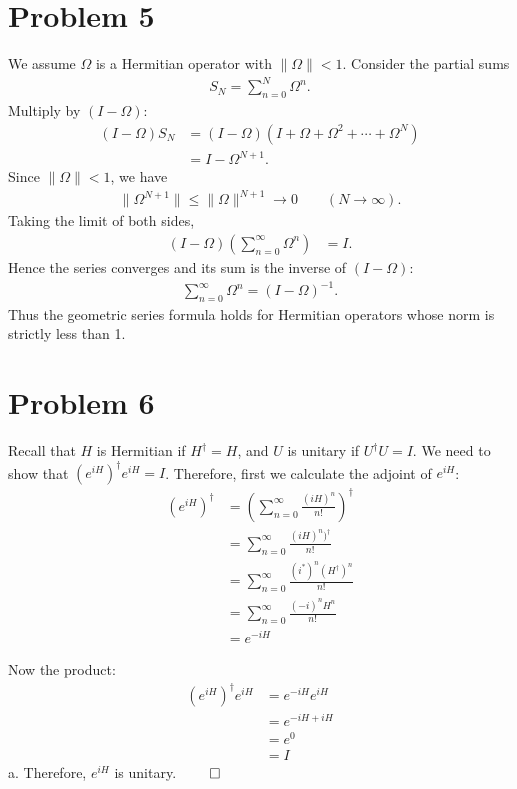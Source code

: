 \documentclass[10pt,twocoloumn]{article}
\begin{document}
\section*{Problem 5}
We assume $\Omega$ is a Hermitian operator with $\|\Omega\|<1$.
Consider the partial sums
\begin{align}
S_N = \sum_{n=0}^N \Omega^n .
\end{align}
Multiply by $(I-\Omega)$:
\begin{align}
(I-\Omega) S_N
&= (I-\Omega)\left(I + \Omega + \Omega^2 + \cdots + \Omega^N\right) \\
&= I - \Omega^{N+1}.
\end{align}
Since $\|\Omega\|<1$, we have
\begin{align}
\|\Omega^{N+1}\| \le \|\Omega\|^{N+1} \longrightarrow 0
\qquad (N\to\infty).
\end{align}
Taking the limit of both sides,
\begin{align}
(I-\Omega)\left( \sum_{n=0}^{\infty} \Omega^n \right)
&= I .
\end{align}
Hence the series converges and its sum is the inverse of $(I-\Omega)$:
\begin{align}
\sum_{n=0}^{\infty} \Omega^n = (I-\Omega)^{-1}.
\end{align}
Thus the geometric series formula holds for Hermitian operators whose norm is strictly less than 1.
\section*{Problem 6}
Recall that $H$ is Hermitian if $H^\dagger = H$, and $U$ is unitary if $U^\dagger U = I$.
We need to show that $(e^{iH})^\dagger e^{iH} = I$.
Therefore, first we calculate the adjoint of $e^{iH}$:
\begin{align}
(e^{iH})^\dagger &= \left(\sum_{n=0}^{\infty} \frac{(iH)^n}{n!}\right)^\dagger \\
&= \sum_{n=0}^{\infty} \frac{(iH)^n)^\dagger}{n!} \\
&= \sum_{n=0}^{\infty} \frac{(i^*)^n (H^\dagger)^n}{n!} \\
&= \sum_{n=0}^{\infty} \frac{(-i)^n H^n}{n!} \\
&= e^{-iH}
\end{align}

Now the product:
\begin{align}
(e^{iH})^\dagger e^{iH} &= e^{-iH} e^{iH} \\
&= e^{-iH + iH} \\
&= e^{0} \\
&= I
\end{align}
a. Therefore, $e^{iH}$ is unitary. $\qed$
\end{document}
